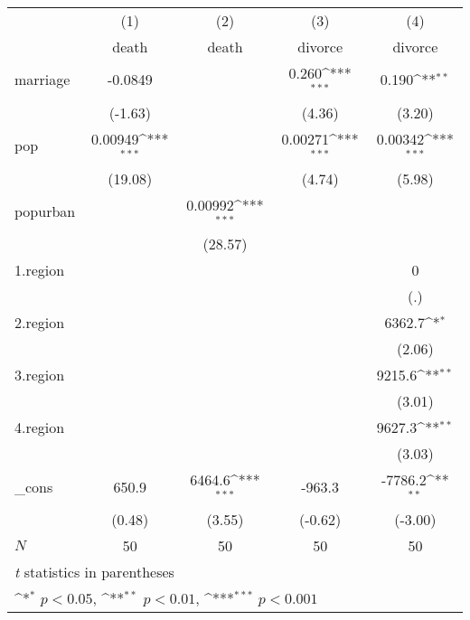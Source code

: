 {
\def\sym#1{\ifmmode^{#1}\else\(^{#1}\)\fi}
\begin{tabular}{l*{4}{c}}
\hline\hline
            &\multicolumn{1}{c}{(1)}&\multicolumn{1}{c}{(2)}&\multicolumn{1}{c}{(3)}&\multicolumn{1}{c}{(4)}\\
            &\multicolumn{1}{c}{death}&\multicolumn{1}{c}{death}&\multicolumn{1}{c}{divorce}&\multicolumn{1}{c}{divorce}\\
\hline
marriage    &     -0.0849         &                     &       0.260\sym{***}&       0.190\sym{**} \\
            &     (-1.63)         &                     &      (4.36)         &      (3.20)         \\
[1em]
pop         &     0.00949\sym{***}&                     &     0.00271\sym{***}&     0.00342\sym{***}\\
            &     (19.08)         &                     &      (4.74)         &      (5.98)         \\
[1em]
popurban    &                     &     0.00992\sym{***}&                     &                     \\
            &                     &     (28.57)         &                     &                     \\
[1em]
1.region    &                     &                     &                     &           0         \\
            &                     &                     &                     &         (.)         \\
[1em]
2.region    &                     &                     &                     &      6362.7\sym{*}  \\
            &                     &                     &                     &      (2.06)         \\
[1em]
3.region    &                     &                     &                     &      9215.6\sym{**} \\
            &                     &                     &                     &      (3.01)         \\
[1em]
4.region    &                     &                     &                     &      9627.3\sym{**} \\
            &                     &                     &                     &      (3.03)         \\
[1em]
\_cons      &       650.9         &      6464.6\sym{***}&      -963.3         &     -7786.2\sym{**} \\
            &      (0.48)         &      (3.55)         &     (-0.62)         &     (-3.00)         \\
\hline
\(N\)       &          50         &          50         &          50         &          50         \\
\hline\hline
\multicolumn{5}{l}{\footnotesize \textit{t} statistics in parentheses}\\
\multicolumn{5}{l}{\footnotesize \sym{*} \(p<0.05\), \sym{**} \(p<0.01\), \sym{***} \(p<0.001\)}\\
\end{tabular}
}
